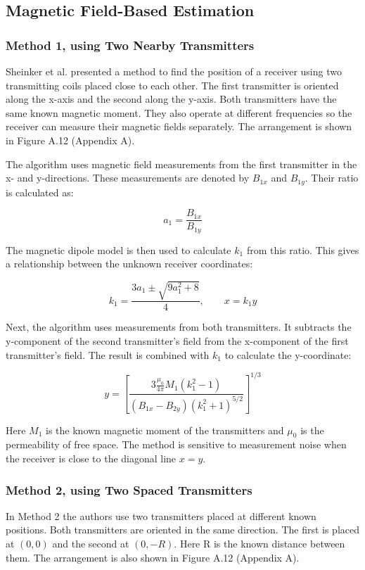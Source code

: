 \subsection{Magnetic Field-Based Estimation} \label{sec:bg-1-5-4}
 \subsubsection{Method 1, using Two Nearby Transmitters}

Sheinker et al. \cite{sheinker2013localization} presented a method to find the position of a receiver using two transmitting coils placed close to each other. 
The first transmitter is oriented along the x-axis and the second along the y-axis. Both transmitters have the same known magnetic moment. 
They also operate at different frequencies so the receiver can measure their magnetic fields separately. The arrangement is 
shown in Figure A.12 (Appendix A).

The algorithm uses magnetic field measurements from the first transmitter in the x- and y-directions. These measurements are denoted 
by \(B_{1x}\) and \(B_{1y}\). Their ratio is calculated as:

\[
a_1=\frac{B_{1x}}{B_{1y}}
\]

The magnetic dipole model is then used to calculate \(k_1\) from this ratio. This gives a relationship between the unknown receiver coordinates:

\[
k_1=\frac{3a_1\pm\sqrt{9a_1^2+8}}{4},\qquad x=k_1y
\]

Next, the algorithm uses measurements from both transmitters. It subtracts the y-component of the second transmitter's field from the x-component of 
the first transmitter's field. The result is combined with \(k_1\) to calculate the y-coordinate:

\[
y=\left[
\frac{3\frac{\mu_0}{4\pi}M_1(k_1^2-1)}
{(B_{1x}-B_{2y})(k_1^2+1)^{5/2}}
\right]^{1/3}
\]

Here \(M_1\) is the known magnetic moment of the transmitters and \(\mu_0\) is the permeability of free space. 
The method is sensitive to measurement noise when the receiver is close to the diagonal line \(x=y\).

\subsubsection{Method 2, using Two Spaced Transmitters}

In Method 2 the authors use two transmitters placed at different known positions. Both transmitters are oriented in the same direction. The first is placed at $(0,0)$ and the second
at $(0,-R)$. Here R is the known distance between them. The arrangement is also shown in Figure A.12 (Appendix A).

